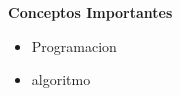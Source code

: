 \begin{frame}

\textbf{Conceptos Importantes}

\begin{itemize}
\item Programacion
\item algoritmo
\end{itemize}

\end{frame}



